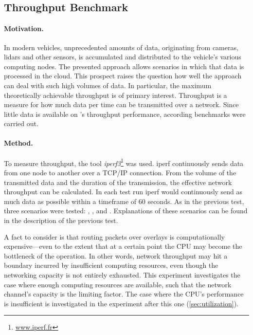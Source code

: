 \subsection{Throughput Benchmark} \label{sec:throughput}
\paragraph{Motivation.}
In modern vehicles, unprecedented amounts of data, originating from cameras, lidars and other sensors, is accumulated and distributed to the vehicle's various computing nodes. The presented approach allows scenarios in which that data is processed in the cloud. This prospect raises the question how well the approach can deal with such high volumes of data. In particular, the maximum theoretically achievable throughput is of primary interest. Throughput is a measure for how much data per time can be transmitted over a network. Since little data is available on \wnet 's throughput performance, according benchmarks were carried out.

\paragraph{Method.} To measure throughput, the tool \emph{iperf3}\footnote{\url{www.iperf.fr}} was used. iperf continuously sends data from one node to another over a TCP/IP connection. From the volume of the transmitted data and the duration of the transmission, the effective network throughput can be calculated. In each test run iperf would continuously send as much data as possible within a timeframe of 60 seconds. As in the previous test, three scenarios were tested:  , , and . Explanations of these scenarios can be found in the description of the previous test.

A fact to consider is that routing packets over overlays is computationally expensive---even to the extent that at a certain point the CPU may become the bottleneck of the operation. In other words, network throughput may hit a boundary incurred by insufficient computing resources, even though the networking capacity is not entirely exhausted. This experiment investigates the case where enough computing resources are available, such that the network channel's capacity is the limiting factor. The case where the CPU's performance is insufficient is investigated in the experiment after this one (\cf \ref{sec:utilization}).

